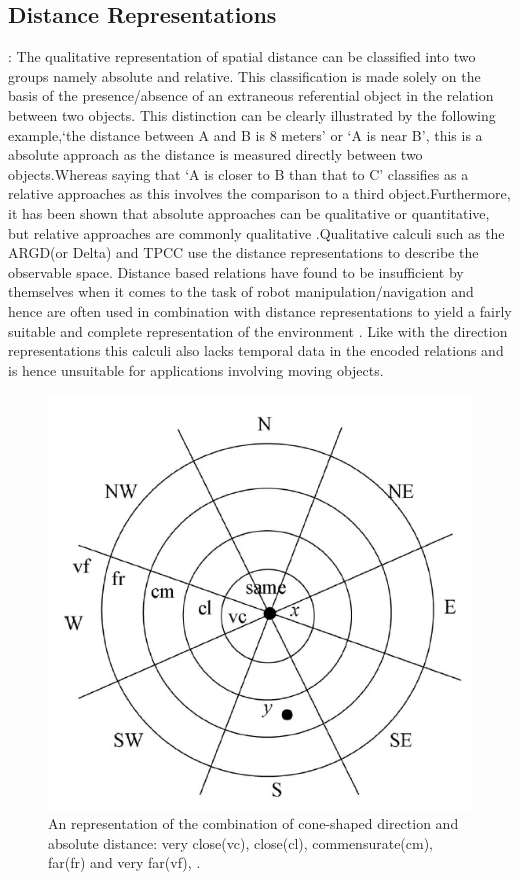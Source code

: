 		\subsection{Distance Representations} \cite{chen2015survey} : The qualitative representation of spatial distance can be classified into two groups namely absolute and relative. This classification is made solely on the basis of  the presence/absence of an extraneous referential object in the relation between two objects. This distinction can be clearly illustrated by the following example,`the distance between A and B is 8 meters' or `A is near B', this is a absolute approach as the distance is measured directly between two objects.Whereas saying that `A is closer to B than that to C' classifies as a relative approaches as this involves the comparison to a third object.Furthermore, it has been shown that absolute approaches	can be qualitative or quantitative, but relative approaches are commonly qualitative \cite{bibid}.Qualitative calculi such as the ARGD(or Delta) and TPCC use the distance representations to describe the observable space. Distance based relations have found to be insufficient by themselves when it comes to the task of robot manipulation/navigation and hence are often used in combination with distance representations to yield a fairly suitable and complete representation of the environment \cite{bibid}. Like with the direction representations this calculi also lacks temporal data in the encoded relations and is hence unsuitable for applications involving moving objects.
		
		\begin{figure}[h]
			\centering
			\includegraphics[scale=0.8]{images/argd_delta}
			\caption{An representation of the combination of cone-shaped direction and absolute distance: very
				close(vc), close(cl), commensurate(cm), far(fr) and very far(vf), \cite{clementini1997qualitative}.}
			\label{fig:argddelta}
		\end{figure}
		
